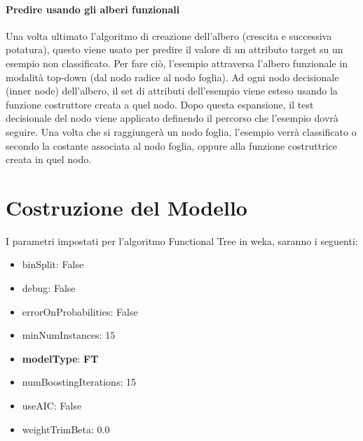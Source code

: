 \paragraph{Predire usando gli alberi funzionali}
Una volta ultimato l'algoritmo di creazione dell'albero (crescita e successiva potatura), questo viene usato per predire il valore di un attributo target su un esempio non classificato. Per fare ciò, l'esempio attraversa l'albero funzionale in modalità top-down (dal nodo radice al nodo foglia). Ad ogni nodo decisionale (inner node) dell'albero, il set di attributi dell'esempio viene esteso usando la funzione costruttore creata a quel nodo. Dopo questa espansione, il test decisionale del nodo viene applicato definendo il percorso che l'esempio dovrà seguire. Una volta che si raggiungerà un nodo foglia, l'esempio verrà classificato o secondo la costante associata al nodo foglia, oppure alla funzione costruttrice creata in quel nodo.

\section{Costruzione del Modello}
I parametri impostati per l'algoritmo Functional Tree in weka, saranno i seguenti:
\begin{multicols}{2}
\begin{itemize}
	\item binSplit: False
	\item debug: False
	\item errorOnProbabilities: False
	\item minNumInstances: 15
	\item \textbf{modelType}: \textbf{FT}
	\item numBoostingIterations: 15
	\item useAIC: False
	\item weightTrimBeta: 0.0
\end{itemize}
\end{multicols}

